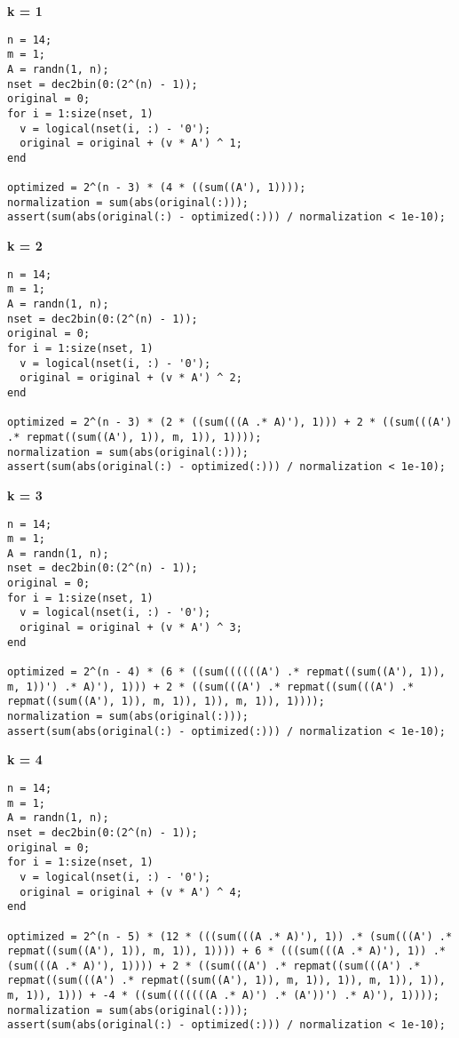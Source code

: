 {\bf k = 1}

\begin{lstlisting}
n = 14;
m = 1;
A = randn(1, n);
nset = dec2bin(0:(2^(n) - 1));
original = 0;
for i = 1:size(nset, 1)
  v = logical(nset(i, :) - '0');
  original = original + (v * A') ^ 1;
end

optimized = 2^(n - 3) * (4 * ((sum((A'), 1))));
normalization = sum(abs(original(:)));
assert(sum(abs(original(:) - optimized(:))) / normalization < 1e-10);
\end{lstlisting}


{\bf k = 2}

\begin{lstlisting}
n = 14;
m = 1;
A = randn(1, n);
nset = dec2bin(0:(2^(n) - 1));
original = 0;
for i = 1:size(nset, 1)
  v = logical(nset(i, :) - '0');
  original = original + (v * A') ^ 2;
end

optimized = 2^(n - 3) * (2 * ((sum(((A .* A)'), 1))) + 2 * ((sum(((A') .* repmat((sum((A'), 1)), m, 1)), 1))));
normalization = sum(abs(original(:)));
assert(sum(abs(original(:) - optimized(:))) / normalization < 1e-10);
\end{lstlisting}


{\bf k = 3}

\begin{lstlisting}
n = 14;
m = 1;
A = randn(1, n);
nset = dec2bin(0:(2^(n) - 1));
original = 0;
for i = 1:size(nset, 1)
  v = logical(nset(i, :) - '0');
  original = original + (v * A') ^ 3;
end

optimized = 2^(n - 4) * (6 * ((sum((((((A') .* repmat((sum((A'), 1)), m, 1))') .* A)'), 1))) + 2 * ((sum(((A') .* repmat((sum(((A') .* repmat((sum((A'), 1)), m, 1)), 1)), m, 1)), 1))));
normalization = sum(abs(original(:)));
assert(sum(abs(original(:) - optimized(:))) / normalization < 1e-10);
\end{lstlisting}


{\bf k = 4}

\begin{lstlisting}
n = 14;
m = 1;
A = randn(1, n);
nset = dec2bin(0:(2^(n) - 1));
original = 0;
for i = 1:size(nset, 1)
  v = logical(nset(i, :) - '0');
  original = original + (v * A') ^ 4;
end

optimized = 2^(n - 5) * (12 * (((sum(((A .* A)'), 1)) .* (sum(((A') .* repmat((sum((A'), 1)), m, 1)), 1)))) + 6 * (((sum(((A .* A)'), 1)) .* (sum(((A .* A)'), 1)))) + 2 * ((sum(((A') .* repmat((sum(((A') .* repmat((sum(((A') .* repmat((sum((A'), 1)), m, 1)), 1)), m, 1)), 1)), m, 1)), 1))) + -4 * ((sum(((((((A .* A)') .* (A'))') .* A)'), 1))));
normalization = sum(abs(original(:)));
assert(sum(abs(original(:) - optimized(:))) / normalization < 1e-10);
\end{lstlisting}


